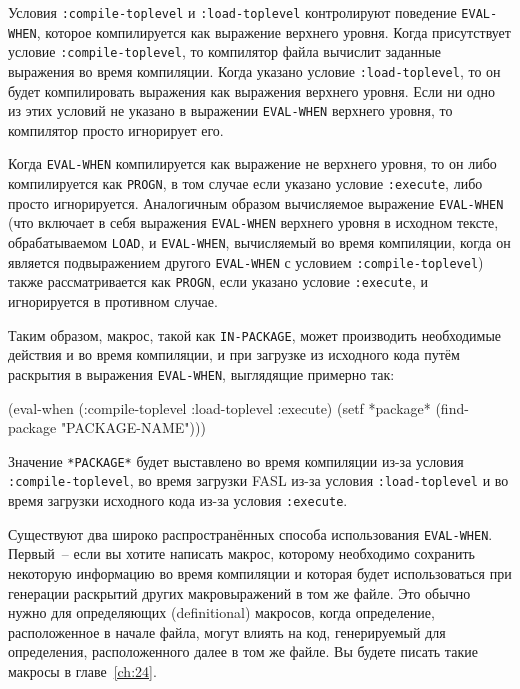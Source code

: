 Условия \lstinline{:compile-toplevel} и \lstinline{:load-toplevel} контролируют поведение
\lstinline{EVAL-WHEN}, которое компилируется как выражение верхнего уровня.  Когда присутствует
условие \lstinline{:compile-toplevel}, то компилятор файла вычислит заданные выражения во время
компиляции.  Когда указано условие \lstinline{:load-toplevel}, то он будет компилировать
выражения как выражения верхнего уровня.  Если ни одно из этих условий не указано в
выражении \lstinline{EVAL-WHEN} верхнего уровня, то компилятор просто игнорирует его.

Когда \lstinline{EVAL-WHEN} компилируется как выражение не верхнего уровня, то он либо
компилируется как \lstinline{PROGN}, в том случае если указано условие
\lstinline{:execute}, либо просто игнорируется.  Аналогичным образом вычисляемое
выражение \lstinline{EVAL-WHEN} (что включает в себя выражения \lstinline{EVAL-WHEN}
верхнего уровня в исходном тексте, обрабатываемом \lstinline{LOAD}, и
\lstinline{EVAL-WHEN}, вычисляемый во время компиляции, когда он является подвыражением
другого \lstinline{EVAL-WHEN} с условием \lstinline{:compile-toplevel}) также
рассматривается как \lstinline{PROGN}, если указано условие \lstinline{:execute}, и
игнорируется в противном случае.

Таким образом, макрос, такой как \lstinline{IN-PACKAGE}, может производить необходимые действия
и во время компиляции, и при загрузке из исходного кода путём раскрытия в выражения
\lstinline{EVAL-WHEN}, выглядящие примерно так:

\begin{myverb}
(eval-when (:compile-toplevel :load-toplevel :execute)
  (setf *package* (find-package "PACKAGE-NAME")))
\end{myverb}

Значение \lstinline{*PACKAGE*} будет выставлено во время компиляции из-за условия
\lstinline{:compile-toplevel}, во время загрузки FASL из-за условия \lstinline{:load-toplevel} и во
время загрузки исходного кода из-за условия \lstinline{:execute}.

Существуют два широко распространённых способа использования \lstinline{EVAL-WHEN}. Первый~--
если вы хотите написать макрос, которому необходимо сохранить некоторую информацию во
время компиляции и которая будет использоваться при генерации раскрытий других
макровыражений в том же файле.  Это обычно нужно для определяющих (definitional)
макросов, когда определение, расположенное в начале файла, могут влиять на код,
генерируемый для определения, расположенного далее в том же файле.  Вы будете писать такие
макросы в главе~\ref{ch:24}.

